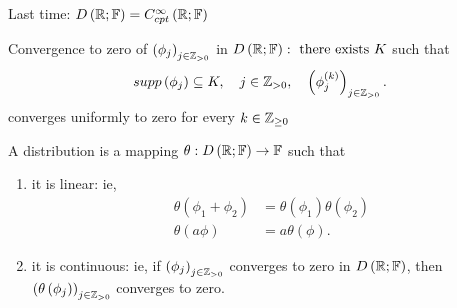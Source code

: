 
Last time: $D\left( \mathbb{R}; \mathbb{F} \right) = C^{\infty}_{cpt}\left( \mathbb{R};\mathbb{F} \right) $ 

Convergence to zero of $\left( \phi _{j} \right) _{j \in \mathbb{Z}_{>0}}$ in $D\left( \mathbb{R}; \mathbb{F} \right): \text{ there exists } K $ such that 
\[
	supp\left( \phi_{j} \right) \subseteq K, \quad j \in  \mathbb{Z}_{>0}, \quad \left( \phi_{j}^{\left( k \right) } \right) _{j \in \mathbb{Z}_{>0}}
.\] converges uniformly to zero for every $k \in  \mathbb{Z}_{\ge 0}$ 

\begin{definition}
	A distribution is a mapping $\theta : D\left( \mathbb{R}; \mathbb{F} \right)  \to \mathbb{F} $ such that 
	\begin{enumerate}
		\item it is linear: ie, 
			\begin{align*}
				\theta \left( \phi_1 + \phi_2 \right) &= \theta\left( \phi_1 \right) \theta\left( \phi_2 \right)  \\
				\theta\left( a\phi \right) &= a \theta\left( \phi \right) 
			.\end{align*}
		\item it is continuous: ie, if $\left( \phi_{j} \right) _{j \in  \mathbb{Z}_{>0}}$ converges to zero in $D\left( \mathbb{R}; \mathbb{F} \right) $, then $\left( \theta\left( \phi_{j} \right)  \right) _{j \in  \mathbb{Z}_{>0}}$ converges to zero. 
	\end{enumerate}
\end{definition}

